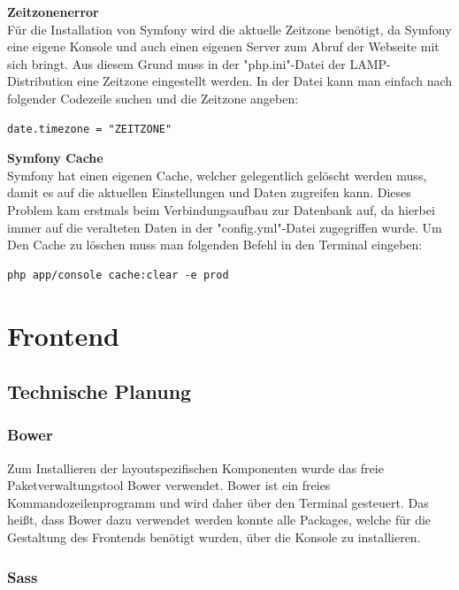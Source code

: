 \textbf{Zeitzonenerror}\\
Für die Installation von Symfony wird die aktuelle Zeitzone benötigt, da Symfony eine eigene Konsole und auch einen eigenen Server zum Abruf der Webseite mit sich bringt.
Aus diesem Grund muss in der "php.ini"-Datei der LAMP-Distribution eine Zeitzone eingestellt werden. In der Datei kann man einfach nach folgender Codezeile suchen und die Zeitzone angeben:
	\lstset{language=java}
  	\begin{lstlisting}
date.timezone = "ZEITZONE"
  	\end{lstlisting}
\textbf{Symfony Cache}\\
Symfony hat einen eigenen Cache, welcher gelegentlich gelöscht werden muss, damit es auf die aktuellen Einstellungen und Daten zugreifen kann.
Dieses Problem kam erstmals beim Verbindungsaufbau zur Datenbank auf, da hierbei immer auf die veralteten Daten in der "config.yml"-Datei zugegriffen wurde.
Um Den Cache zu löschen muss man folgenden Befehl in den Terminal eingeben:
	\lstset{language=bash}
  	\begin{lstlisting}
php app/console cache:clear -e prod
  	\end{lstlisting}

\section{Frontend}

  \subsection{Technische Planung}

    \subsubsection{Bower}

Zum Installieren der layoutspezifischen Komponenten wurde das freie Paketverwaltungstool {Bower\cite{bower}} verwendet. Bower ist ein freies Kommandozeilenprogramm und wird daher über den Terminal gesteuert. Das heißt, dass Bower dazu verwendet werden konnte alle Packages, welche für die Gestaltung des Frontends benötigt wurden, über die Konsole zu installieren.

    \subsubsection{Sass}

